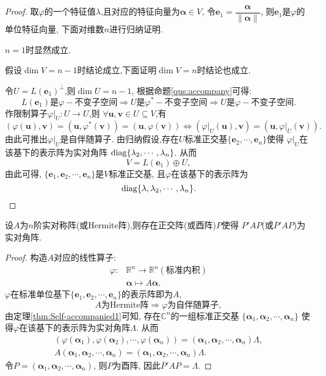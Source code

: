 \begin{proof}
  取$\varphi$的一个特征值$\lambda$,且对应的特征向量为$\bm{\alpha}\in V$,
  令$\bm{e}_1=\dfrac{\bm{\alpha}}{\|\bm{\alpha}\|}$,
  则$\bm{e}_1$是$\varphi$的单位特征向量,
  下面对维数$n$进行归纳证明.

  $n=1$时显然成立.
  
  假设$\dim V=n-1$时结论成立,下面证明$\dim V=n$时结论也成立.

  令$U=L(\bm{e}_1)^{\perp}$,则$\dim U=n-1$,
  根据命题\ref{qus:accompany}可得:
  \[
     L(\bm{e}_1)\text{是}\varphi-\text{不变子空间} \Longrightarrow 
     U\text{是}\varphi^*-\text{不变子空间} \Longrightarrow 
     U\text{是}\varphi-\text{不变子空间}.
  \]
  作限制算子$\varphi|_U:U\rightarrow U$,则
  $\forall \bm{u},\bm{v}\in U \subseteq V$,有
  \[
  (\varphi(\bm{u}),\bm{v}) = (\bm{u},\varphi^*(\bm{v})) 
  = (\bm{u},\varphi(\bm{v})) \Longleftrightarrow 
  (\varphi|_U(\bm{u}),\bm{v}) = (\bm{u},\varphi|_U(\bm{v})).
  \]
由此可推出$\varphi|_U$是自伴随算子.
由归纳假设,存在$U$标准正交基$\{\bm{e}_2,\cdots,\bm{e}_n\}$使得 
$\varphi|_U$在该基下的表示阵为实对角阵
$\operatorname{diag} \{\lambda_2,\cdots, \lambda_n\}$.
从而
\[
V=L(\bm{e}_1)\oplus U,
\]
由此可得, $\{\bm{e}_1,\bm{e}_2,\cdots,\bm{e}_n\}$是$V$标准正交基,
且$\varphi$在该基下的表示阵为
\[
\operatorname{diag} \{\lambda,\lambda_2,\cdots, \lambda_n\}.
\]
\end{proof}

\begin{theorem}\label{thm:Self-accompanied2}
  设$A$为$n$阶实对称阵(或Hermite阵),则存在正交阵(或酉阵)$P$使得
  $P'AP$(或$\overline{P}'AP$)为实对角阵.
\end{theorem}

\begin{proof}
  构造$A$对应的线性算子:
  \begin{align*}
    \varphi: & \mathbb{R}^n \longrightarrow \mathbb{R}^n(\text{标准内积})\\
    & \bm{\alpha} \longmapsto A\bm{\alpha}.
  \end{align*}
  $\varphi$在标准单位基下$\{\bm{e}_1,\bm{e}_2,\cdots,\bm{e}_n\}$的表示阵即为$A$,
  \[
  A\text{为Hermite阵} \Longrightarrow \varphi\text{为自伴随算子}, 
  \]
  由定理\ref{thm:Self-accompanied1}可知,
  存在$\mathbb{C}^n$的一组标准正交基
  $\{\bm{\alpha}_1,\bm{\alpha}_2,\cdots,\bm{\alpha}_n\}$
  使得$\varphi$在该基下的表示阵为实对角阵$\Lambda$.
  从而
  \begin{align*}
    (\varphi(\bm{\alpha}_1),\varphi(\bm{\alpha}_2),\cdots,\varphi(\bm{\alpha}_n))
    = (\bm{\alpha}_1,\bm{\alpha}_2,\cdots,\bm{\alpha}_n)\Lambda,\\
    A(\bm{\alpha}_1,\bm{\alpha}_2,\cdots,\bm{\alpha}_n) =
    (\bm{\alpha}_1,\bm{\alpha}_2,\cdots,\bm{\alpha}_n)\Lambda.
  \end{align*}
  令$P=(\bm{\alpha}_1,\bm{\alpha}_2,\cdots,\bm{\alpha}_n)$,
  则$P$为酉阵, 因此$\overline{P}'AP=\Lambda$.
\end{proof}

